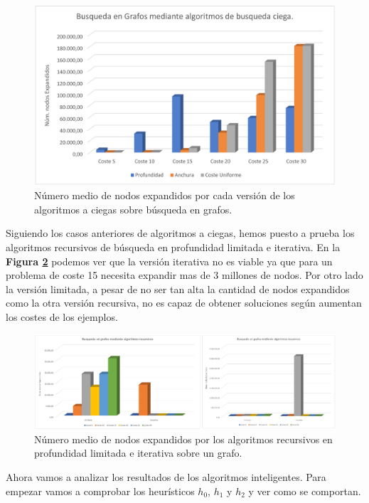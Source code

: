 \documentclass[runningheads]{llncs}
\begin{document}
\begin{figure}
	\centering
	\includegraphics[width=\textwidth]{ejercicio1.jpg}
	\caption{Número medio de nodos expandidos por cada versión de los algoritmos a ciegas sobre búsqueda en grafos.} 
	\label{figura_ciega_grafo}
\end{figure}

Siguiendo los casos anteriores de algoritmos a ciegas, hemos puesto a prueba los algoritmos recursivos de búsqueda en profundidad limitada e iterativa. En la \textbf{Figura \ref{figura_recursiva_grafo}} podemos ver que la versión iterativa no es viable ya que para un problema de coste 15 necesita expandir mas de 3 millones de nodos. Por otro lado la versión limitada, a pesar de no ser tan alta la cantidad de nodos expandidos como la otra versión recursiva, no es capaz de obtener soluciones según aumentan los costes de los ejemplos.

\begin{figure}[H]
	\centering
	\includegraphics[width=\textwidth]{ejercicio2_3.jpg}
	\caption{Número medio de nodos expandidos por los algoritmos recursivos  en profundidad limitada e iterativa sobre un grafo.} 
	\label{figura_recursiva_grafo}
\end{figure}

Ahora vamos a analizar los resultados de los algoritmos inteligentes. Para empezar vamos a comprobar los heurísticos $ h_0 $, $ h_1 $ y $ h_2 $ y ver como se comportan. 
\end{document}
